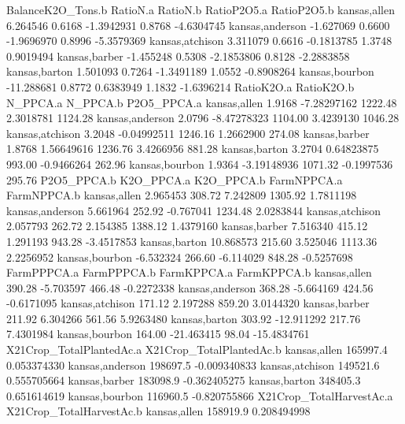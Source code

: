 \documentclass{report}
\begin{document}
\begin{Schunk}
\begin{Soutput}
                BalanceK2O_Tons.b RatioN.a   RatioN.b RatioP2O5.a RatioP2O5.b
kansas,allen             6.264546   0.6168 -1.3942931      0.8768  -4.6304745
kansas,anderson         -1.627069   0.6600 -1.9696970      0.8996  -5.3579369
kansas,atchison          3.311079   0.6616 -0.1813785      1.3748   0.9019494
kansas,barber           -1.455248   0.5308 -2.1853806      0.8128  -2.2883858
kansas,barton            1.501093   0.7264 -1.3491189      1.0552  -0.8908264
kansas,bourbon         -11.288681   0.8772  0.6383949      1.1832  -1.6396214
                RatioK2O.a  RatioK2O.b N_PPCA.a   N_PPCA.b P2O5_PPCA.a
kansas,allen        1.9168 -7.28297162  1222.48  2.3018781     1124.28
kansas,anderson     2.0796 -8.47278323  1104.00  3.4239130     1046.28
kansas,atchison     3.2048 -0.04992511  1246.16  1.2662900      274.08
kansas,barber       1.8768  1.56649616  1236.76  3.4266956      881.28
kansas,barton       3.2704  0.64823875   993.00 -0.9466264      262.96
kansas,bourbon      1.9364 -3.19148936  1071.32 -0.1997536      295.76
                P2O5_PPCA.b K2O_PPCA.a K2O_PPCA.b FarmNPPCA.a FarmNPPCA.b
kansas,allen       2.965453     308.72   7.242809     1305.92   1.7811198
kansas,anderson    5.661964     252.92  -0.767041     1234.48   2.0283844
kansas,atchison    2.057793     262.72   2.154385     1388.12   1.4379160
kansas,barber      7.516340     415.12   1.291193      943.28  -3.4517853
kansas,barton     10.868573     215.60   3.525046     1113.36   2.2256952
kansas,bourbon    -6.532324     266.60  -6.114029      848.28  -0.5257698
                FarmPPPCA.a FarmPPPCA.b FarmKPPCA.a FarmKPPCA.b
kansas,allen         390.28   -5.703597      466.48  -0.2272338
kansas,anderson      368.28   -5.664169      424.56  -0.6171095
kansas,atchison      171.12    2.197288      859.20   3.0144320
kansas,barber        211.92    6.304266      561.56   5.9263480
kansas,barton        303.92  -12.911292      217.76   7.4301984
kansas,bourbon       164.00  -21.463415       98.04 -15.4834761
                X21Crop_TotalPlantedAc.a X21Crop_TotalPlantedAc.b
kansas,allen                    165997.4              0.053374330
kansas,anderson                 198697.5             -0.009340833
kansas,atchison                 149521.6              0.555705664
kansas,barber                   183098.9             -0.362405275
kansas,barton                   348405.3              0.651614619
kansas,bourbon                  116960.5             -0.820755866
                X21Crop_TotalHarvestAc.a X21Crop_TotalHarvestAc.b
kansas,allen                    158919.9              0.208494998

\end{Soutput}
\end{Schunk}
\end{document}
